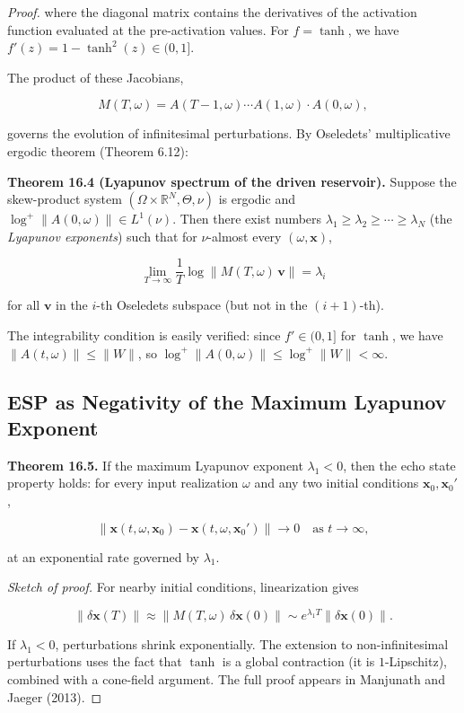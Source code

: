 \begin{proof}
where the diagonal matrix contains the derivatives of the activation function evaluated at the pre-activation values. For $f = \tanh$, we have $f'(z) = 1 - \tanh^2(z) \in (0, 1]$.

The product of these Jacobians,

\[
M(T, \omega) = A(T-1, \omega) \cdots A(1, \omega) \cdot A(0, \omega),
\]

governs the evolution of infinitesimal perturbations. By Oseledets' multiplicative ergodic theorem (Theorem 6.12):

\textbf{Theorem 16.4 (Lyapunov spectrum of the driven reservoir).} Suppose the skew-product system $(\Omega \times \mathbb{R}^N, \Theta, \nu)$ is ergodic and $\log^+ \|A(0, \omega)\| \in L^1(\nu)$. Then there exist numbers $\lambda_1 \geq \lambda_2 \geq \cdots \geq \lambda_N$ (the \textit{Lyapunov exponents}) such that for $\nu$-almost every $(\omega, \mathbf{x})$,

\[
\lim_{T \to \infty} \frac{1}{T} \log \|M(T, \omega)\, \mathbf{v}\| = \lambda_i
\]

for all $\mathbf{v}$ in the $i$-th Oseledets subspace (but not in the $(i+1)$-th).

The integrability condition is easily verified: since $f' \in (0,1]$ for $\tanh$, we have $\|A(t,\omega)\| \leq \|W\|$, so $\log^+ \|A(0,\omega)\| \leq \log^+\|W\| < \infty$.

\subsection{ESP as Negativity of the Maximum Lyapunov Exponent}\label{sec:16.3.2}

\textbf{Theorem 16.5.} If the maximum Lyapunov exponent $\lambda_1 < 0$, then the echo state property holds: for every input realization $\omega$ and any two initial conditions $\mathbf{x}_0, \mathbf{x}_0'$,

\[
\|\mathbf{x}(t, \omega, \mathbf{x}_0) - \mathbf{x}(t, \omega, \mathbf{x}_0')\| \to 0 \quad \text{as } t \to \infty,
\]

at an exponential rate governed by $\lambda_1$.

\textit{Sketch of proof.} For nearby initial conditions, linearization gives

\[
\|\delta \mathbf{x}(T)\| \approx \|M(T, \omega) \, \delta \mathbf{x}(0)\| \sim e^{\lambda_1 T} \|\delta \mathbf{x}(0)\|.
\]

If $\lambda_1 < 0$, perturbations shrink exponentially. The extension to non-infinitesimal perturbations uses the fact that $\tanh$ is a global contraction (it is $1$-Lipschitz), combined with a cone-field argument. The full proof appears in Manjunath and Jaeger (2013).
\end{proof}


